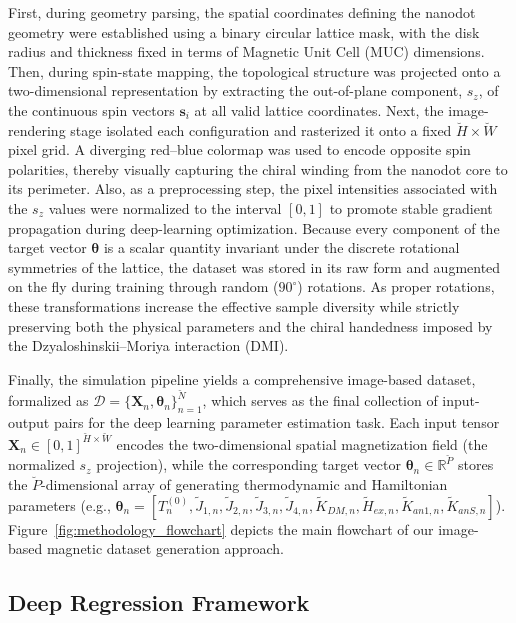 \documentclass[final,5p,times,twocolumn]{elsarticle}
\begin{document}
First, during geometry parsing, the spatial coordinates defining the nanodot geometry were established using a binary circular lattice mask, with the disk radius and thickness fixed in terms of Magnetic Unit Cell (MUC) dimensions. Then, during spin-state mapping, the topological structure was projected onto a two-dimensional representation by extracting the out-of-plane component, $s_z$, of the continuous spin vectors $\mathbf{s}_i$ at all valid lattice coordinates. Next, the image-rendering stage isolated each configuration and rasterized it onto a fixed $\breve{H} \times \breve{W}$ pixel grid. A diverging red–blue colormap was used to encode opposite spin polarities, thereby visually capturing the chiral winding from the nanodot core to its perimeter. Also, as a preprocessing step, the pixel intensities associated with the $s_z$ values were normalized to the interval $[0,1]$ to promote stable gradient propagation during deep-learning optimization. Because every component of the target vector $\boldsymbol{\theta}$ is a scalar quantity invariant under the discrete rotational symmetries of the lattice, the dataset was stored in its raw form and augmented on the fly during training through random ($90^\circ$) rotations. As proper rotations, these transformations increase the effective sample diversity while strictly preserving both the physical parameters and the chiral handedness imposed by the Dzyaloshinskii–Moriya interaction (DMI).


Finally, the simulation pipeline yields a comprehensive image-based dataset, formalized as $\mathcal{D} = \{\mathbf{X}_n, \boldsymbol{\theta}_n\}_{n=1}^{\breve{N}}$, which serves as the final collection of input-output pairs for the deep learning parameter estimation task. Each input tensor $\mathbf{X}_n \in [0,1]^{\breve{H} \times \breve{W}}$ encodes the two-dimensional spatial magnetization field (the normalized $s_z$ projection), while the corresponding target vector $\boldsymbol{\theta}_n \in \mathbb{R}^{\breve{P}}$ stores the $\breve{P}$-dimensional array of generating thermodynamic and Hamiltonian parameters (e.g., $\boldsymbol{\theta}_n = [T^{(0)}_n,\tilde{J}_{1,n},\tilde{J}_{2,n},\tilde{J}_{3,n},\tilde{J}_{4,n},\tilde{K}_{DM,n},\tilde{H}_{ex,n},\tilde{K}_{an1,n},\tilde{K}_{anS,n}]$). Figure~\ref{fig:methodology_flowchart} depicts the main flowchart of our image-based magnetic dataset generation approach.



\subsection{Deep Regression Framework}\label{sec:Deep_Learning}
\end{document}
